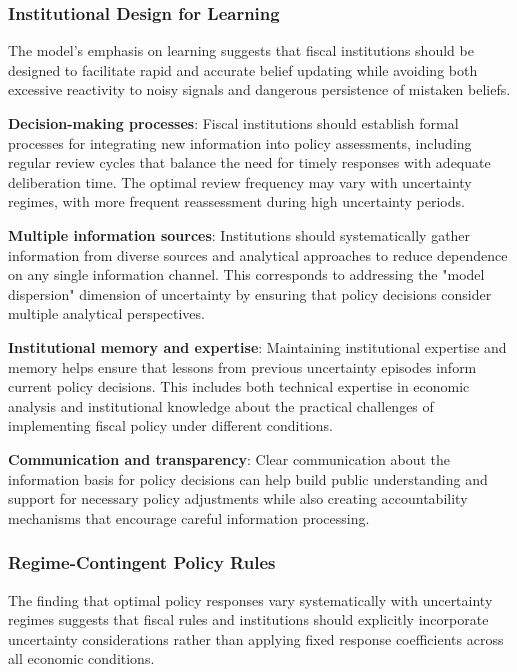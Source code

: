 \documentclass[5p,authoryear]{elsarticle}
\begin{document}
\subsubsection{Institutional Design for Learning}

The model's emphasis on learning suggests that fiscal institutions should be designed to facilitate rapid and accurate belief updating while avoiding both excessive reactivity to noisy signals and dangerous persistence of mistaken beliefs.

\textbf{Decision-making processes}: Fiscal institutions should establish formal processes for integrating new information into policy assessments, including regular review cycles that balance the need for timely responses with adequate deliberation time. The optimal review frequency may vary with uncertainty regimes, with more frequent reassessment during high uncertainty periods.

\textbf{Multiple information sources}: Institutions should systematically gather information from diverse sources and analytical approaches to reduce dependence on any single information channel. This corresponds to addressing the "model dispersion" dimension of uncertainty by ensuring that policy decisions consider multiple analytical perspectives.

\textbf{Institutional memory and expertise}: Maintaining institutional expertise and memory helps ensure that lessons from previous uncertainty episodes inform current policy decisions. This includes both technical expertise in economic analysis and institutional knowledge about the practical challenges of implementing fiscal policy under different conditions.

\textbf{Communication and transparency}: Clear communication about the information basis for policy decisions can help build public understanding and support for necessary policy adjustments while also creating accountability mechanisms that encourage careful information processing.

\subsubsection{Regime-Contingent Policy Rules}

The finding that optimal policy responses vary systematically with uncertainty regimes suggests that fiscal rules and institutions should explicitly incorporate uncertainty considerations rather than applying fixed response coefficients across all economic conditions.
\end{document}
